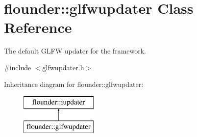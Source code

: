 \hypertarget{classflounder_1_1glfwupdater}{}\section{flounder\+:\+:glfwupdater Class Reference}
\label{classflounder_1_1glfwupdater}


The default G\+L\+FW updater for the framework.  




{\ttfamily \#include $<$glfwupdater.\+h$>$}

Inheritance diagram for flounder\+:\+:glfwupdater\+:\begin{figure}[H]
\begin{center}
\leavevmode
\includegraphics[height=2.000000cm]{classflounder_1_1glfwupdater}
\end{center}
\end{figure}
